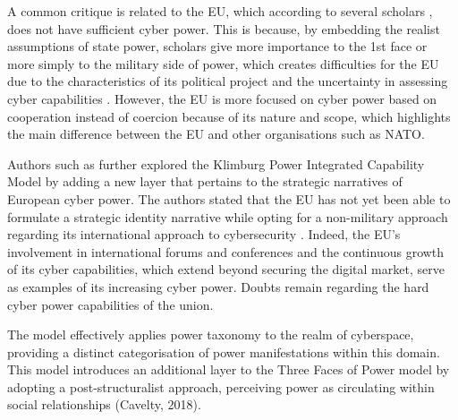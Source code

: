 A common critique is related to the EU, which according to several scholars \parencite{kasper_2021_the, klimburg_2011_cybersecurity, sliwinski_2014_moving}, does not have sufficient cyber power. This is because, by embedding the realist assumptions of state power, scholars give more importance to the 1st face or more simply to the military side of power, which creates difficulties for the EU due to the characteristics of its political project and the uncertainty in assessing cyber capabilities \autocite{dunncavelty_2018_europes}. However, the EU is more focused on cyber power based on cooperation instead of coercion because of its nature and scope, which highlights the main difference between the EU and other organisations such as NATO. 

Authors such as \textcite{kasper_2021_the} further explored the Klimburg Power Integrated Capability Model by adding a new layer that pertains to the strategic narratives of European cyber power. The authors stated that the EU has not yet been able to formulate a strategic identity narrative while opting for a non-military approach regarding its international approach to cybersecurity \autocite[64]{kasper_2021_the}. Indeed, the EU's involvement in international forums and conferences and the continuous growth of its cyber capabilities, which extend beyond securing the digital market, serve as examples of its increasing cyber power. Doubts remain regarding the hard cyber power capabilities of the union. 

The \textcite{betz_2011_cyberspace} model effectively applies \textcite{barnett_2005_power} power taxonomy to the realm of cyberspace, providing a distinct categorisation of power manifestations within this domain. This model introduces an additional layer to the Three Faces of Power model by adopting a post-structuralist approach, perceiving power as circulating within social relationships (Cavelty, 2018). 

